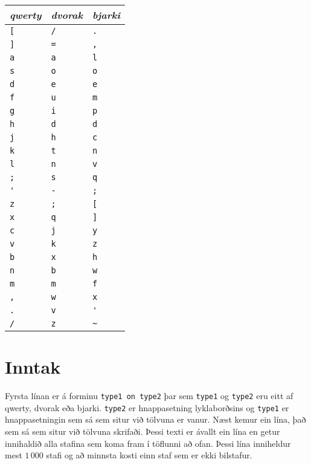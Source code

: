 \begin{minipage}{0.45\textwidth}
\begin{tabular}{|l|l|l|} \hline
\emph{qwerty} & \emph{dvorak} & \emph{bjarki} \\ \hline
\verb![! & \verb!/! & \verb!.! \\
\verb!]! & \verb!=! & \verb!,! \\
\verb!a! & \verb!a! & \verb!l! \\
\verb!s! & \verb!o! & \verb!o! \\
\verb!d! & \verb!e! & \verb!e! \\
\verb!f! & \verb!u! & \verb!m! \\
\verb!g! & \verb!i! & \verb!p! \\
\verb!h! & \verb!d! & \verb!d! \\
\verb!j! & \verb!h! & \verb!c! \\
\verb!k! & \verb!t! & \verb!n! \\
\verb!l! & \verb!n! & \verb!v! \\
\verb!;! & \verb!s! & \verb!q! \\
\verb!'! & \verb!-! & \verb!;! \\
\verb!z! & \verb!;! & \verb![! \\
\verb!x! & \verb!q! & \verb!]! \\
\verb!c! & \verb!j! & \verb!y! \\
\verb!v! & \verb!k! & \verb!z! \\
\verb!b! & \verb!x! & \verb!h! \\
\verb!n! & \verb!b! & \verb!w! \\
\verb!m! & \verb!m! & \verb!f! \\
\verb!,! & \verb!w! & \verb!x! \\
\verb!.! & \verb!v! & \verb!'! \\
\verb!/! & \verb!z! & \verb!~! \\ \hline
\end{tabular}
\end{minipage}

\section*{Inntak}
Fyrsta línan er á forminu \texttt{type1 on type2} þar sem \texttt{type1} og \texttt{type2} eru eitt af qwerty, 
dvorak eða bjarki. \texttt{type2} er hnappasetning lyklaborðsins og \texttt{type1} er hnappasetningin sem sá
sem situr við tölvuna er vanur.
Næst kemur ein lína, það sem sá sem situr við tölvuna skrifaði. Þessi texti er ávallt ein lína en getur
innihaldið alla stafina sem koma fram í töflunni að ofan. Þessi lína inniheldur mest $1\,000$ stafi og að minnsta
kosti einn staf sem er ekki bilstafur.

